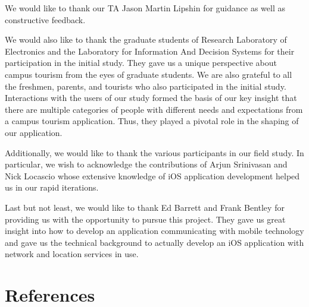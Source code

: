 \documentclass{sigchi}
\begin{document}
We would like to thank our TA Jason Martin Lipshin for guidance as well as constructive feedback. 

We would also like to thank the graduate students of Research Laboratory of Electronics and the Laboratory for Information And Decision Systems for their participation in the initial study. They gave us a unique perspective about campus tourism from the eyes of graduate students. We are also grateful to all the freshmen, parents, and tourists who also participated in the initial study. Interactions with the users of our study formed the basis of our key insight that there are multiple categories of people with different needs and expectations from a campus tourism application. Thus, they played a pivotal role in the shaping of our application. 

Additionally, we would like to thank the various participants in our field study. In particular, we wish to acknowledge the contributions of Arjun Srinivasan and Nick Locascio whose extensive knowledge of iOS application development helped us in our rapid iterations. 

Last but not least, we would like to thank Ed Barrett and Frank Bentley for providing us with the opportunity to pursue this project. They gave us great insight into how to develop an
application communicating with mobile technology and gave us the technical background to actually develop an iOS application with network and location services in use. 

%
%
%
%
%
\balance

\section{References}
\end{document}
